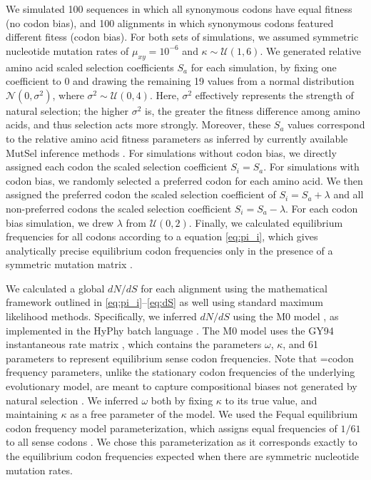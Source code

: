 \documentclass{pnastwo}
\begin{document}
\begin{article}
We simulated 100 sequences in which all synonymous codons have equal fitness (no codon bias), and 100 alignments in which synonymous codons featured different fitess (codon bias). For both sets of simulations, we assumed symmetric nucleotide mutation rates of $\mu_{xy} = 10^{-6}$ and $\kappa \sim \mathcal{U} (1,6)$. We generated relative amino acid scaled selection coefficients $S_a$ for each simulation, by fixing one coefficient to 0 and drawing the remaining 19 values from a normal distribution $\mathcal{N}(0,\sigma^2)$, where $\sigma^2 \sim \mathcal{U}(0,4)$. Here, $\sigma^2$ effectively represents the strength of natural selection; the higher $\sigma^2$ is, the greater the fitness difference among amino acids, and thus selection acts more strongly. Moreover, these $S_a$ values correspond to the relative amino acid fitness parameters as inferred by currently available MutSel inference methods \cite{RodrigueLartillot2014,Tamurietal2014}.
For simulations without codon bias, we directly assigned each codon the scaled selection coefficient $S_i = S_a$. For simulations with codon bias, we randomly selected a preferred codon for each amino acid. We then assigned the preferred codon the scaled selection coefficient of $S_i = S_a + \lambda$ and all non-preferred codons the scaled selection coefficient $S_i = S_a - \lambda$. For each codon bias simulation, we drew $\lambda$ from $\mathcal{U}(0,2)$. Finally, we calculated equilibrium frequencies for all codons according to a equation \eqref{eq:pi_i}, which gives analytically precise equilibrium codon frequencies only in the presence of a symmetric mutation matrix \cite{SellaHirsh2005}.

We calculated a global $dN/dS$ for each alignment using the mathematical framework outlined in \eqref{eq:pi_i}--\eqref{eq:dS} as well using standard maximum likelihood methods. Specifically, we inferred $dN/dS$ using the M0 model \cite{Yangetal2000}, as implemented in the HyPhy batch language \cite{KosakovskyPondetal2005}. The M0 model uses the GY94 instantaneous rate matrix \cite{GoldmanYang1994,NielsenYang1998}, which contains the parameters $\omega$, $\kappa$, and 61 parameters to represent equilibrium sense codon frequencies. Note that =codon frequency parameters, unlike the stationary codon frequencies of the underlying evolutionary model, are meant to capture compositional biases not generated by natural selection \cite{GoldmanYang1994,MuseGaut1994,YN00,Yang2006}. We inferred $\omega$ both by fixing $\kappa$ to its true value, and maintaining $\kappa$ as a free parameter of the model. We used the Fequal equilibrium codon frequency model parameterization, which assigns equal frequencies of $1/61$ to all sense codons \cite{Yang2006}. We chose this parameterization as it corresponds exactly to the equilibrium codon frequencies expected when there are symmetric nucleotide mutation rates.



\end{article}
\end{document}
